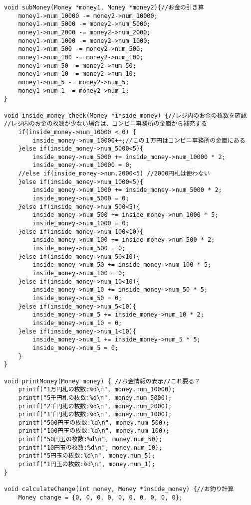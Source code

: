\documentclass[a4j,11pt]{jarticle}
\begin{document}
\begin{lstlisting}
void subMoney(Money *money1, Money *money2){//お金の引き算
    money1->num_10000 -= money2->num_10000;
    money1->num_5000 -= money2->num_5000;
    money1->num_2000 -= money2->num_2000;
    money1->num_1000 -= money2->num_1000;
    money1->num_500 -= money2->num_500;
    money1->num_100 -= money2->num_100;
    money1->num_50 -= money2->num_50;
    money1->num_10 -= money2->num_10;
    money1->num_5 -= money2->num_5;
    money1->num_1 -= money2->num_1;
}

void inside_money_check(Money *inside_money) {//レジ内のお金の枚数を確認  //レジ内のお金の枚数が少ない場合は、コンビニ事務所の金庫から補充する
    if(inside_money->num_10000 < 0) {
        inside_money->num_10000++;//この１万円はコンビニ事務所の金庫にある
    }else if(inside_money->num_5000<5){
        inside_money->num_5000 += inside_money->num_10000 * 2;
        inside_money->num_10000 = 0;
    //else if(inside_money->num.2000<5) //2000円札は使わない
    }else if(inside_money->num_1000<5){
        inside_money->num_1000 += inside_money->num_5000 * 2;
        inside_money->num_5000 = 0;
    }else if(inside_money->num_500<5){
        inside_money->num_500 += inside_money->num_1000 * 5;
        inside_money->num_1000 = 0;
    }else if(inside_money->num_100<10){
        inside_money->num_100 += inside_money->num_500 * 2;
        inside_money->num_500 = 0;
    }else if(inside_money->num_50<10){
        inside_money->num_50 += inside_money->num_100 * 5;
        inside_money->num_100 = 0;
    }else if(inside_money->num_10<10){
        inside_money->num_10 += inside_money->num_50 * 5;
        inside_money->num_50 = 0;
    }else if(inside_money->num_5<10){
        inside_money->num_5 += inside_money->num_10 * 2;
        inside_money->num_10 = 0;
    }else if(inside_money->num_1<10){
        inside_money->num_1 += inside_money->num_5 * 5;
        inside_money->num_5 = 0;
    }
}

void printMoney(Money money) { //お金情報の表示//これ要る？
    printf("1万円札の枚数:%d\n", money.num_10000);
    printf("5千円札の枚数:%d\n", money.num_5000);
    printf("2千円札の枚数:%d\n", money.num_2000);
    printf("1千円札の枚数:%d\n", money.num_1000);
    printf("500円玉の枚数:%d\n", money.num_500);
    printf("100円玉の枚数:%d\n", money.num_100);
    printf("50円玉の枚数:%d\n", money.num_50);
    printf("10円玉の枚数:%d\n", money.num_10);
    printf("5円玉の枚数:%d\n", money.num_5);
    printf("1円玉の枚数:%d\n", money.num_1);
}

void calculateChange(int money, Money *inside_money) {//お釣り計算
    Money change = {0, 0, 0, 0, 0, 0, 0, 0, 0, 0};


\end{lstlisting}
\end{document}
